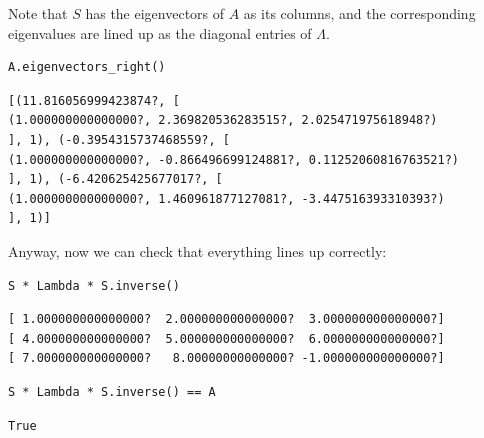 \documentclass[10pt,]{book}
\theoremstyle{plain}
\theoremstyle{definition}
\numberwithin{equation}{section}
\begin{document}
      Note that \(S\) has the eigenvectors of \(A\) as its columns, and the
      corresponding eigenvalues are lined up as the diagonal entries of \(\Lambda\).
\begin{lstlisting}[style=sageinput]
A.eigenvectors_right()
\end{lstlisting}
\begin{lstlisting}[style=sageoutput]
[(11.816056999423874?, [
(1.000000000000000?, 2.369820536283515?, 2.025471975618948?)
], 1), (-0.3954315737468559?, [
(1.000000000000000?, -0.866496699124881?, 0.11252060816763521?)
], 1), (-6.420625425677017?, [
(1.000000000000000?, 1.460961877127081?, -3.447516393310393?)
], 1)]
\end{lstlisting}
\par
Anyway, now we can check that everything lines up correctly:%
\begin{lstlisting}[style=sageinput]
S * Lambda * S.inverse()
\end{lstlisting}
\begin{lstlisting}[style=sageoutput]
[ 1.000000000000000?  2.000000000000000?  3.000000000000000?]
[ 4.000000000000000?  5.000000000000000?  6.000000000000000?]
[ 7.000000000000000?   8.00000000000000? -1.000000000000000?]
\end{lstlisting}
\begin{lstlisting}[style=sageinput]
S * Lambda * S.inverse() == A
\end{lstlisting}
\begin{lstlisting}[style=sageoutput]
True
\end{lstlisting}
\typeout{************************************************}
\typeout{************************************************}
\end{document}
